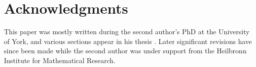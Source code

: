 \documentclass[12pt,a4paper,reqno]{amsart}
\theoremstyle{remark}
\numberwithin{equation}{section}
\begin{document}
\section*{Acknowledgments}
This paper was mostly written during the second author's PhD at the University of York, and various sections appear in his thesis \cite{APCThesis}. Later significant revisions have since been made while the second author was under support from the Heilbronn Institute for Mathematical Research.



	
\end{document}
